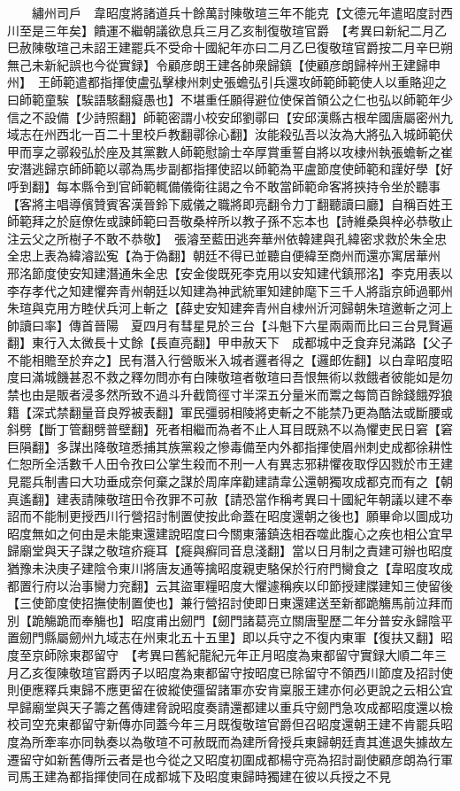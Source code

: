 　　繡州司戶　韋昭度將諸道兵十餘萬討陳敬瑄三年不能克【文德元年遣昭度討西川至是三年矣】饋運不繼朝議欲息兵三月乙亥制復敬瑄官爵　【考異曰新紀二月乙巳赦陳敬瑄己未詔王建罷兵不受命十國紀年亦曰二月乙巳復敬瑄官爵按二月辛巳朔無己未新紀誤也今從實録】令顧彦朗王建各帥衆歸鎮【使顧彦朗歸梓州王建歸申州】　王師範遣都指揮使盧弘擊棣州刺史張蟾弘引兵還攻師範師範使人以重賂迎之曰師範童騃【騃語駭翻癡愚也】不堪重任願得避位使保首領公之仁也弘以師範年少信之不設備【少詩照翻】師範密謂小校安邱劉鄩曰【安邱漢縣古根牟國唐屬密州九域志在州西北一百二十里校戶教翻鄩徐心翻】汝能殺弘吾以汝為大將弘入城師範伏甲而享之鄩殺弘於座及其黨數人師範慰諭士卒厚賞重誓自將以攻棣州執張蟾斬之崔安潛逃歸京師師範以鄩為馬步副都指揮使詔以師範為平盧節度使師範和謹好學【好呼到翻】每本縣令到官師範輒備儀衛往謁之令不敢當師範命客將挾持令坐於聽事【客將主唱導儐贊賓客漢晉鈴下威儀之職將即亮翻令力丁翻聽讀曰廳】自稱百姓王師範拜之於庭僚佐或諫師範曰吾敬桑梓所以教子孫不忘本也【詩維桑與梓必恭敬止注云父之所樹子不敢不恭敬】　張濬至藍田逃奔華州依韓建與孔緯密求救於朱全忠全忠上表為緯濬訟寃【為于偽翻】朝廷不得已並聽自便緯至商州而還亦寓居華州　邢洺節度使安知建潛通朱全忠【安金俊既死李克用以安知建代鎮邢洺】李克用表以李存孝代之知建懼奔青州朝廷以知建為神武統軍知建帥麾下三千人將詣京師過鄆州朱瑄與克用方睦伏兵河上斬之【薛史安知建奔青州自棣州沂河歸朝朱瑄邀斬之河上帥讀曰率】傳首晉陽　夏四月有彗星見於三台【斗魁下六星兩兩而比曰三台見賢遍翻】東行入太微長十丈餘【長直亮翻】甲申赦天下　成都城中乏食弃兒滿路【父子不能相贍至於弃之】民有潛入行營販米入城者邏者得之【邏郎佐翻】以白韋昭度昭度曰滿城饑甚忍不救之釋勿問亦有白陳敬瑄者敬瑄曰吾恨無術以救餓者彼能如是勿禁也由是販者浸多然所致不過斗升截筒徑寸半深五分量米而鬻之每筒百餘錢餓殍狼籍【深式禁翻量音良殍被表翻】軍民彊弱相陵將吏斬之不能禁乃更為酷法或斷腰或斜劈【斷丁管翻劈普壁翻】死者相繼而為者不止人耳目既熟不以為懼吏民日窘【窘巨隕翻】多謀出降敬瑄悉捕其族黨殺之慘毒備至内外都指揮使眉州刺史成都徐耕性仁恕所全活數千人田令孜曰公掌生殺而不刑一人有異志邪耕懼夜取俘囚戮於市王建見罷兵制書曰大功垂成奈何棄之謀於周庠庠勸建請韋公還朝獨攻成都克而有之【朝真遙翻】建表請陳敬瑄田令孜罪不可赦【請恐當作稱考異曰十國紀年朝議以建不奉詔而不能制更授西川行營招討制置使按此命蓋在昭度還朝之後也】願畢命以圖成功昭度無如之何由是未能東還建說昭度曰今關東藩鎮迭相吞噬此腹心之疾也相公宜早歸廟堂與天子謀之敬瑄疥㿅耳【㿅與癬同音息淺翻】當以日月制之責建可辦也昭度猶豫未決庚子建陰令東川將唐友通等擒昭度親吏駱保於行府門臠食之【韋昭度攻成都置行府以治事臠力兖翻】云其盜軍糧昭度大懼遽稱疾以印節授建牒建知三使留後【三使節度使招撫使制置使也】兼行營招討使即日東還建送至新都跪觴馬前泣拜而別【跪觴跪而奉觴也】昭度甫出劒門【劒門諸葛亮立關唐聖歷二年分普安永歸陰平置劒門縣屬劒州九域志在州東北五十五里】即以兵守之不復内東軍【復扶又翻】昭度至京師除東郡留守　【考異曰舊紀龍紀元年正月昭度為東都留守實録大順二年三月乙亥復陳敬瑄官爵丙子以昭度為東都留守按昭度已除留守不領西川節度及招討使則便應釋兵東歸不應更留在彼縱使彊留諸軍亦安肯稟服王建亦何必更說之云相公宜早歸廟堂與天子籌之舊傳建脅說昭度奏請還都建以重兵守劒門急攻成都昭度還以檢校司空充東都留守新傳亦同蓋今年三月既復敬瑄官爵但召昭度還朝王建不肯罷兵昭度為所牽率亦同執奏以為敬瑄不可赦既而為建所脅授兵東歸朝廷責其進退失據故左遷留守如新舊傳所云者是也今從之又昭度初圍成都楊守亮為招討副使顧彦朗為行軍司馬王建為都指揮使同在成都城下及昭度東歸時獨建在彼以兵授之不見